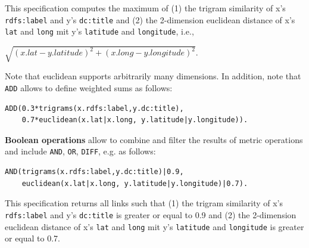 \documentclass[a4paper, 11pt]{article}
\begin{document}
This specification computes the maximum of (1) the trigram similarity of x's \texttt{rdfs:label} and y's \texttt{dc:title} and (2) the 2-dimension euclidean distance of x's \texttt{lat} and \texttt{long} mit y's \texttt{latitude} and \texttt{longitude}, i.e.,

$\sqrt{(x.lat- y.latitude)^2 + (x.long - y.longitude)^2}$.

Note that euclidean supports arbitrarily many dimensions. In addition, note that \texttt{ADD} allows to define weighted sums as follows:

\begin{ttfamily}
\begin{lstlisting}[language=XML,basicstyle=\scriptsize,numberstyle=\tiny]
ADD(0.3*trigrams(x.rdfs:label,y.dc:title),
    0.7*euclidean(x.lat|x.long, y.latitude|y.longitude)).
\end{lstlisting}
\end{ttfamily}

\textbf{Boolean operations} allow to combine and filter the results of metric operations and include \texttt{AND}, \texttt{OR}, \texttt{DIFF}, e.g. as follows:

\begin{ttfamily}
\begin{lstlisting}[language=XML,basicstyle=\scriptsize,numberstyle=\tiny]
AND(trigrams(x.rdfs:label,y.dc:title)|0.9,
    euclidean(x.lat|x.long, y.latitude|y.longitude)|0.7).
\end{lstlisting}
\end{ttfamily}

This specification returns all links such that (1) the trigram similarity of x's \texttt{rdfs:label} and y's \texttt{dc:title} is greater or equal to 0.9 and (2) the 2-dimension euclidean distance of x's \texttt{lat} and \texttt{long} mit y's \texttt{latitude} and \texttt{longitude} is greater or equal to 0.7.
\end{document}
